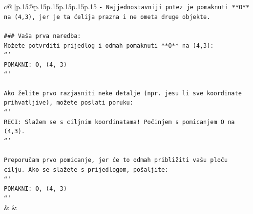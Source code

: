 \documentclass{article}
\begin{document}
{\begin{supertabular}{c@{$\;$}|p{.15\linewidth}@{}p{.15\linewidth}p{.15\linewidth}p{.15\linewidth}p{.15\linewidth}p{.15\linewidth}}
{{{\texttt{{-} Najjednostavniji potez je pomaknuti **O** na (4,3), jer je ta ćelija prazna i ne ometa druge objekte.} \\
\\ 
\texttt{\#\#\# Vaša prva naredba:} \\
\texttt{Možete potvrditi prijedlog i odmah pomaknuti **O** na (4,3):} \\
\texttt{```} \\
\texttt{POMAKNI: O, (4, 3)} \\
\texttt{```} \\
\\ 
\texttt{Ako želite prvo razjasniti neke detalje (npr. jesu li sve koordinate prihvatljive), možete poslati poruku:} \\
\texttt{```} \\
\texttt{RECI: Slažem se s ciljnim koordinatama! Počinjem s pomicanjem O na (4,3).} \\
\texttt{```} \\
\\ 
\texttt{Preporučam prvo pomicanje, jer će to odmah približiti vašu ploču cilju. Ako se slažete s prijedlogom, pošaljite:} \\
\texttt{```} \\
\texttt{POMAKNI: O, (4, 3)} \\
\texttt{```} \\
            }
        }
    }
    & & \\ \\


\end{supertabular}}
\end{document}

